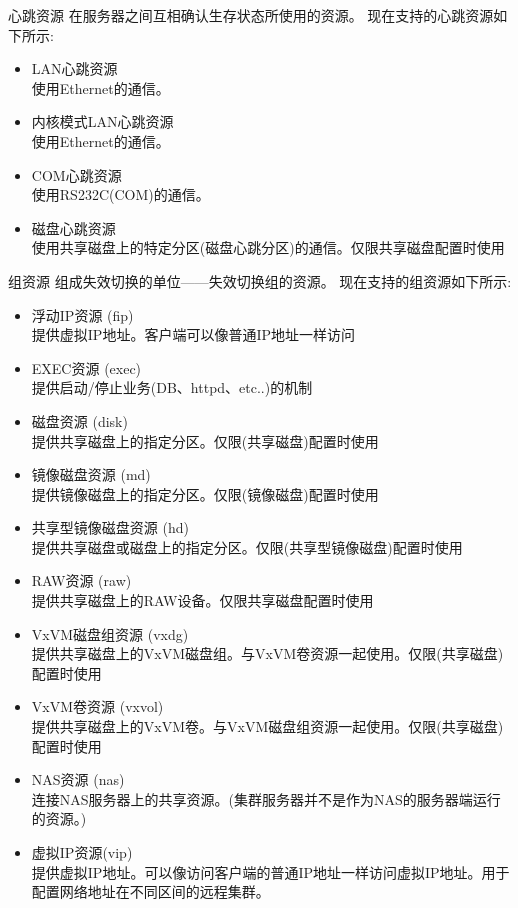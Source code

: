 \documentclass[compress,trans]{beamer} %
\begin{document}
\begin{frame}{心跳资源}
在服务器之间互相确认生存状态所使用的资源。
现在支持的心跳资源如下所示:
\begin{itemize}
  \item LAN心跳资源 \\  使用Ethernet的通信。
  \item 内核模式LAN心跳资源  \\ 使用Ethernet的通信。
  \item COM心跳资源 \\  使用RS232C(COM)的通信。
  \item 磁盘心跳资源 \\ 使用共享磁盘上的特定分区(磁盘心跳分区)的通信。仅限共享磁盘配置时使用
\end{itemize}
\end{frame}

\begin{frame}{组资源}
\fontsize{7pt}{2}
   组成失效切换的单位——失效切换组的资源。
   现在支持的组资源如下所示:
\begin{itemize}
  \item 浮动IP资源 (fip) \\ 提供虚拟IP地址。客户端可以像普通IP地址一样访问
  \item EXEC资源 (exec) \\ 提供启动/停止业务(DB、httpd、etc..)的机制
  \item 磁盘资源 (disk) \\ 提供共享磁盘上的指定分区。仅限(共享磁盘)配置时使用
  \item 镜像磁盘资源 (md) \\ 提供镜像磁盘上的指定分区。仅限(镜像磁盘)配置时使用
  \item 共享型镜像磁盘资源 (hd) \\ 提供共享磁盘或磁盘上的指定分区。仅限(共享型镜像磁盘)配置时使用
  \item RAW资源 (raw) \\ 提供共享磁盘上的RAW设备。仅限共享磁盘配置时使用
  \item VxVM磁盘组资源 (vxdg) \\ 提供共享磁盘上的VxVM磁盘组。与VxVM卷资源一起使用。仅限(共享磁盘)配置时使用
  \item VxVM卷资源 (vxvol) \\ 提供共享磁盘上的VxVM卷。与VxVM磁盘组资源一起使用。仅限(共享磁盘)配置时使用
  \item NAS资源 (nas) \\ 连接NAS服务器上的共享资源。(集群服务器并不是作为NAS的服务器端运行的资源。) 
  \item 虚拟IP资源(vip) \\ 提供虚拟IP地址。可以像访问客户端的普通IP地址一样访问虚拟IP地址。用于配置网络地址在不同区间的远程集群。
\end{itemize}
\end{frame}
\end{document}
